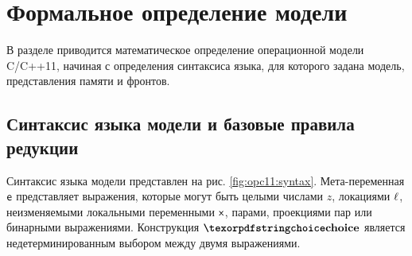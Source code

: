 \section{Формальное определение модели}
\label{sec:opc11:formal}
В разделе приводится математическое определение операционной модели C/C++11,
начиная с определения синтаксиса языка, для которого задана модель,
представления памяти и фронтов.

\subsection{Синтаксис языка модели и базовые правила редукции}
\label{sec:opc11:formal:baselang}
Синтаксис языка модели представлен на рис. \ref{fig:opc11:syntax}.
Мета-переменная $\mathsf{e}$ представляет выражения, которые могут быть
целыми числами $z$, локациями $\ell$, неизменяемыми локальными
переменными $\mathsf{x}$, парами, проекциями пар или бинарными выражениями.
Конструкция $\kw{choice}$ является недетерминированным выбором между двумя
выражениями.

